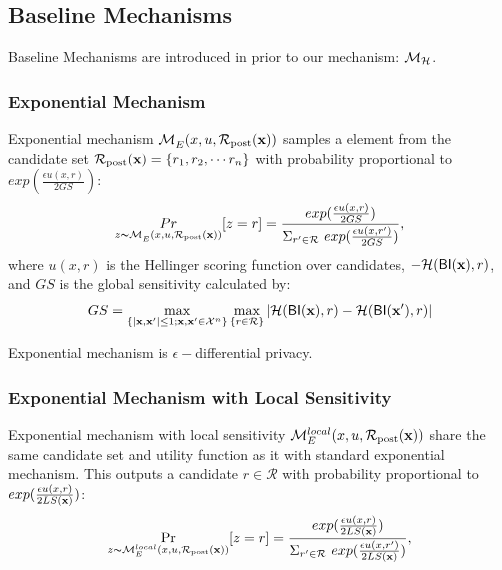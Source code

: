 \documentclass{article}
\begin{document}
\subsection{Baseline Mechanisms}
\label{subsec_baselines}
Baseline Mechanisms are introduced in prior to our mechanism: $\mathcal{M}_{\mathcal{H}}$.

\subsubsection{Exponential Mechanism}
Exponential mechanism $\mathcal{M}_E^{}({x},{u},{\mathcal{R}_{\textup{post}}(\textbf{x})})$ samples a element from the candidate set $\mathcal{R}_{\textup{post}}(\textbf{x}) = \{r_1, r_2, \cdots r_n\}$ with probability proportional to $exp(\frac{\epsilon u(x,r)}{2 GS})$:
\begin{equation*}
\underset{z \thicksim \mathcal{M}_E^{}({x},{u},{\mathcal{R}_{\textup{post}}(\textbf{x})}) }{Pr}[z=r] = \frac
{exp(\frac{\epsilon u(x,r)}{2 GS})}
{\Sigma_{r' \in \mathcal{R}}\ exp(\frac{\epsilon u(x,r')}{2 GS})},
\end{equation*}
where $u(x,r)$ is the Hellinger scoring function over candidates, $-\mathcal{H}(\mathsf{BI}(\textbf{x}), r)$, and $GS$ is the global sensitivity calculated by:
\begin{equation*}
GS = 
\max_{\{|\textbf{x},\textbf{x}'| \leq 1;\textbf{x},\textbf{x}'\in \mathcal{X}^n\}}\max_{\{r\in \mathcal{R}\}}
|\mathcal{H}(\mathsf{BI}(\textbf{x}), r) - \mathcal{H}(\mathsf{BI}(\textbf{x}'), r)|
\end{equation*}

Exponential mechanism is $\epsilon -$differential privacy\cite{dwork2014algorithmic}.


\subsubsection{Exponential Mechanism with Local Sensitivity}
\label{subsec_emls}
Exponential mechanism with local sensitivity $\mathcal{M}_E^{local}({x},{u},{\mathcal{R}_{\textup{post}}(\textbf{x})})$ share the same candidate set and utility function as it with standard exponential mechanism. This outputs a candidate $r \in \mathcal{R}$ with probability proportional to $exp(\frac{\epsilon u(x,r)}{2 LS(\textbf{x})})$:
\begin{equation*}
\underset{z \thicksim \mathcal{M}_E^{local}({x},{u},{\mathcal{R}_{\textup{post}}(\textbf{x})})}{\Pr}[z=r] = \frac
{exp(\frac{\epsilon u(x,r)}{2 LS(\textbf{x})})}
{\Sigma_{r' \in \mathcal{R}}\ exp(\frac{\epsilon u(x,r')}{2 LS(\textbf{x})})},
\end{equation*}
\end{document}
